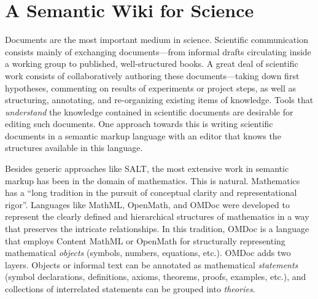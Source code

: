 \section{A Semantic Wiki for Science}
\label{sec:science}

\begin{figure}
  \centering
  \vspace{-.9cm}
  \vspace{-1.2cm}
\end{figure}
Documents are the most important medium in science.
Scientific
communication consists mainly of exchanging documents---from informal drafts circulating
inside a working group to published, well-structured books.  A great deal of scientific
work consists of collaboratively authoring these documents---taking down first hypotheses,
commenting on results of experiments or project steps, as well as structuring, annotating,
and re-organizing existing items of knowledge.  Tools that
\emph{understand} the knowledge contained in scientific documents are desirable for
editing such documents.  One approach towards this is writing scientific documents in a
semantic markup language with an editor that knows the structures available in this
language.

Besides generic approaches like SALT\cite{Groza:SALT07}, the most extensive work
in semantic markup has been in the domain of mathematics.  This is natural.
Mathematics has a ``long tradition in the pursuit of conceptual clarity and
representational rigor''\cite{Kohlhase:omdoc1.2}.  Languages like
MathML\cite{CarlisleEd:MathML07}, OpenMath\cite{BusCapCar:2oms04}, and
OMDoc\cite{Kohlhase:omdoc1.2} were developed to represent the clearly defined
and hierarchical structures of mathematics in a way that preserves the intricate
relationships.  In this tradition, OMDoc is a language that employs Content
MathML or OpenMath for structurally representing mathematical \emph{objects}
(symbols, numbers, equations, etc.).  OMDoc adds two layers.  Objects or
informal text can be annotated as mathematical \emph{statements} (symbol
declarations, definitions, axioms, theorems, proofs, examples, etc.), and
collections of interrelated statements can be grouped into \emph{theories}.

